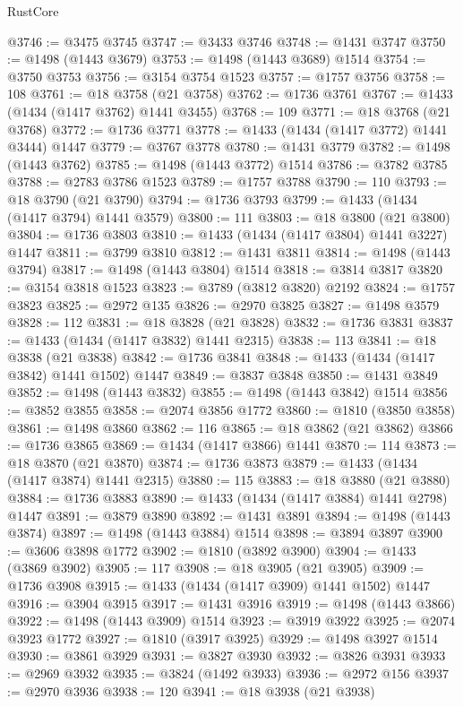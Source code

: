 \begin{lexlean}{RustCore}
\begin{coremodule}
@3746 := @3475 @3745
@3747 := @3433 @3746
@3748 := @1431 @3747
@3750 := @1498 (@1443 @3679)
@3753 := @1498 (@1443 @3689) @1514
@3754 := @3750 @3753
@3756 := @3154 @3754 @1523
@3757 := @1757 @3756
@3758 := 108
@3761 := @18 @3758 (@21 @3758)
@3762 := @1736 @3761
@3767 := @1433 (@1434 (@1417 @3762) @1441 @3455)
@3768 := 109
@3771 := @18 @3768 (@21 @3768)
@3772 := @1736 @3771
@3778 := @1433 (@1434 (@1417 @3772) @1441 @3444) @1447
@3779 := @3767 @3778
@3780 := @1431 @3779
@3782 := @1498 (@1443 @3762)
@3785 := @1498 (@1443 @3772) @1514
@3786 := @3782 @3785
@3788 := @2783 @3786 @1523
@3789 := @1757 @3788
@3790 := 110
@3793 := @18 @3790 (@21 @3790)
@3794 := @1736 @3793
@3799 := @1433 (@1434 (@1417 @3794) @1441 @3579)
@3800 := 111
@3803 := @18 @3800 (@21 @3800)
@3804 := @1736 @3803
@3810 := @1433 (@1434 (@1417 @3804) @1441 @3227) @1447
@3811 := @3799 @3810
@3812 := @1431 @3811
@3814 := @1498 (@1443 @3794)
@3817 := @1498 (@1443 @3804) @1514
@3818 := @3814 @3817
@3820 := @3154 @3818 @1523
@3823 := @3789 (@3812 @3820) @2192
@3824 := @1757 @3823
@3825 := @2972 @135
@3826 := @2970 @3825
@3827 := @1498 @3579
@3828 := 112
@3831 := @18 @3828 (@21 @3828)
@3832 := @1736 @3831
@3837 := @1433 (@1434 (@1417 @3832) @1441 @2315)
@3838 := 113
@3841 := @18 @3838 (@21 @3838)
@3842 := @1736 @3841
@3848 := @1433 (@1434 (@1417 @3842) @1441 @1502) @1447
@3849 := @3837 @3848
@3850 := @1431 @3849
@3852 := @1498 (@1443 @3832)
@3855 := @1498 (@1443 @3842) @1514
@3856 := @3852 @3855
@3858 := @2074 @3856 @1772
@3860 := @1810 (@3850 @3858)
@3861 := @1498 @3860
@3862 := 116
@3865 := @18 @3862 (@21 @3862)
@3866 := @1736 @3865
@3869 := @1434 (@1417 @3866) @1441
@3870 := 114
@3873 := @18 @3870 (@21 @3870)
@3874 := @1736 @3873
@3879 := @1433 (@1434 (@1417 @3874) @1441 @2315)
@3880 := 115
@3883 := @18 @3880 (@21 @3880)
@3884 := @1736 @3883
@3890 := @1433 (@1434 (@1417 @3884) @1441 @2798) @1447
@3891 := @3879 @3890
@3892 := @1431 @3891
@3894 := @1498 (@1443 @3874)
@3897 := @1498 (@1443 @3884) @1514
@3898 := @3894 @3897
@3900 := @3606 @3898 @1772
@3902 := @1810 (@3892 @3900)
@3904 := @1433 (@3869 @3902)
@3905 := 117
@3908 := @18 @3905 (@21 @3905)
@3909 := @1736 @3908
@3915 := @1433 (@1434 (@1417 @3909) @1441 @1502) @1447
@3916 := @3904 @3915
@3917 := @1431 @3916
@3919 := @1498 (@1443 @3866)
@3922 := @1498 (@1443 @3909) @1514
@3923 := @3919 @3922
@3925 := @2074 @3923 @1772
@3927 := @1810 (@3917 @3925)
@3929 := @1498 @3927 @1514
@3930 := @3861 @3929
@3931 := @3827 @3930
@3932 := @3826 @3931
@3933 := @2969 @3932
@3935 := @3824 (@1492 @3933)
@3936 := @2972 @156
@3937 := @2970 @3936
@3938 := 120
@3941 := @18 @3938 (@21 @3938)

\end{coremodule}
\end{lexlean}
